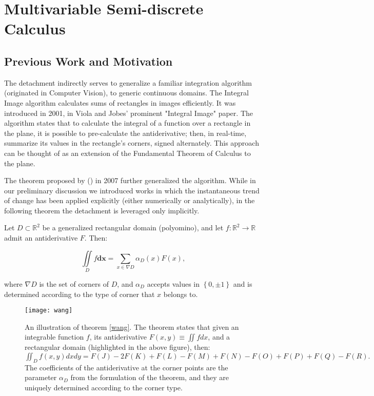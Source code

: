 \documentclass[11pt]{book}
\begin{document}
\chapter{Multivariable Semi-discrete Calculus}

\section{Previous Work and Motivation}
The detachment indirectly serves to generalize a familiar integration algorithm (originated in Computer Vision), to generic continuous domains. The Integral Image algorithm calculates sums of rectangles in images efficiently. It was introduced in 2001, in Viola and Jobes' prominent "Integral Image" paper. The algorithm states that to calculate the integral of a function over a rectangle in the plane, it is possible to pre-calculate the antiderivative; then, in real-time, summarize its values in the rectangle’s corners, signed alternately. This approach can be thought of as an extension of the Fundamental Theorem of Calculus to the plane. 

The theorem proposed by (\cite{wang2007shape}) in 2007 further generalized the algorithm. While in our preliminary discussion we introduced works in which the instantaneous trend of change has been applied explicitly (either numerically or analytically), in the following theorem the detachment is leveraged only implicitly.

\begin{theorem}[Wang et al]Let $D\subset\mathbb{R}^{2}$ be a generalized rectangular domain (polyomino), and let $f:\mathbb{R}^{2}\rightarrow\mathbb{R}$ admit an antiderivative $F.$ Then:

$$\underset{{\scriptscriptstyle D}}{\iint}f\boldsymbol{dx}=\underset{{\scriptscriptstyle x\in\nabla D}}{\sum}\alpha_{D}\left(x\right)F\left(x\right),$$

where $\nabla D$ is the set of corners of $D$, and $\alpha_{D}$ accepts values in $\left\{ 0,\pm1\right\} $ and is determined according to the type of corner that $x$ belongs to.
\label{wang}
\end{theorem}

\begin{figure}
\texttt{[image: wang]}
\caption{An illustration of theorem \ref{wang}. The theorem states that given an integrable function $f$, its antiderivative $F\left(x,y\right)\equiv\iint f dx$, and a rectangular domain (highlighted in the above figure), then: $\iint_{D}f(x,y)dxdy=F(J)-2F(K)+F(L)-F(M)+F(N)-F(O)+F(P)+F(Q)-F(R).$ The coefficients of the antiderivative at the corner points are the parameter $\alpha_{D}$ from the formulation of the theorem, and they are uniquely determined according to the corner type.}
\end{figure}
\end{document}
